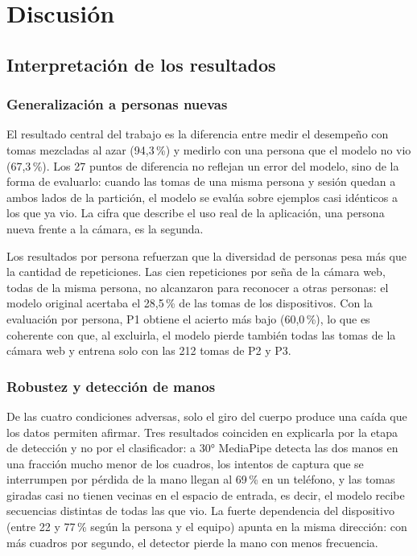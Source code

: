 \chapter{Discusión}
\label{cap:discusion}

\section{Interpretación de los resultados}

\subsection{Generalización a personas nuevas}

El resultado central del trabajo es la diferencia entre medir el desempeño con tomas mezcladas al azar (94,3\,\%) y medirlo con una persona que el modelo no vio (67,3\,\%). Los 27 puntos de diferencia no reflejan un error del modelo, sino de la forma de evaluarlo: cuando las tomas de una misma persona y sesión quedan a ambos lados de la partición, el modelo se evalúa sobre ejemplos casi idénticos a los que ya vio. La cifra que describe el uso real de la aplicación, una persona nueva frente a la cámara, es la segunda.

Los resultados por persona refuerzan que la diversidad de personas pesa más que la cantidad de repeticiones. Las cien repeticiones por seña de la cámara web, todas de la misma persona, no alcanzaron para reconocer a otras personas: el modelo original acertaba el 28,5\,\% de las tomas de los dispositivos. Con la evaluación por persona, P1 obtiene el acierto más bajo (60,0\,\%), lo que es coherente con que, al excluirla, el modelo pierde también todas las tomas de la cámara web y entrena solo con las 212 tomas de P2 y P3.

\subsection{Robustez y detección de manos}

De las cuatro condiciones adversas, solo el giro del cuerpo produce una caída que los datos permiten afirmar. Tres resultados coinciden en explicarla por la etapa de detección y no por el clasificador: a 30° MediaPipe detecta las dos manos en una fracción mucho menor de los cuadros, los intentos de captura que se interrumpen por pérdida de la mano llegan al 69\,\% en un teléfono, y las tomas giradas casi no tienen vecinas en el espacio de entrada, es decir, el modelo recibe secuencias distintas de todas las que vio. La fuerte dependencia del dispositivo (entre 22 y 77\,\% según la persona y el equipo) apunta en la misma dirección: con más cuadros por segundo, el detector pierde la mano con menos frecuencia.

